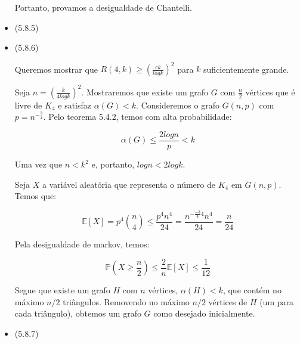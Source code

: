 \documentclass{article}
\begin{document}
\begin{itemize}
	      Portanto, provamos a desigualdade de Chantelli.


	\item (5.8.5)
	\item (5.8.6)

	      Queremos mostrar que \(R(4, k) \geq (\frac{ck}{log k})^2\) para \(k\) suficientemente grande.

	      Seja \(n = (\frac{k}{4 log k})^2\). Mostraremos que existe um grafo \(G\) com \(\frac{n}{2}\) vértices que é livre de \(K_4\) e satisfaz \(\alpha(G) < k\).
	      Consideremos o grafo \(G(n,p)\) com \(p = n^{-\frac{3}{4}}\). Pelo teorema 5.4.2, temos com alta probabilidade:

	      \[\alpha(G) \leq \frac{2 log n}{p} < k\]

	      Uma vez que \(n < k^2\) e, portanto, \(log n < 2 log k\).

	      Seja \(X\) a variável aleatória que representa o número de \(K_4\) em \(G(n, p)\). Temos que:

	      \[\mathbb{E}[X] = p^4 \binom{n}{4} \leq \frac{p^4 n^4}{24} = \frac{n^{-\frac{-3}{4} 4} n ^ 4}{24} = \frac{n}{24}\]

	      Pela desigualdade de markov, temos:

	      \[\mathbb{P}(X \geq \frac{n}{2}) \leq \frac{2}{n}\mathbb{E}[X] \leq \frac{1}{12}\]

	      Segue que existe um grafo \(H\) com \(n\) vértices, \(\alpha(H) < k\), que contém no
	      máximo \(n/2\) triângulos. Removendo no máximo \(n/2\) vértices de \(H\) (um para
	      cada triângulo), obtemos um grafo \(G\) como desejado inicialmente.


	\item (5.8.7)
\end{itemize}
\end{document}
